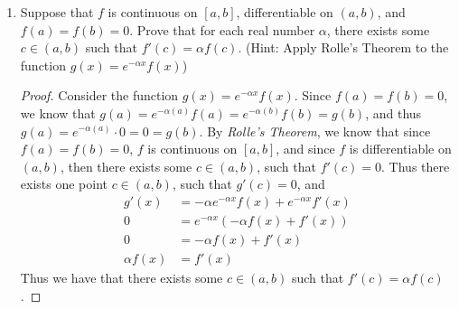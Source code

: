 \documentclass[12pt,letterpaper]{article}
\newcommand{\st}{\ \text{s.t.}\ }
\theoremstyle{case}
\theoremstyle{definition}
\newtheorem{theorem*}{Theorem}
\begin{document}
\begin{enumerate}
\begin{enumerate}
\begin{proof}
				Let $h(x)=f(x)^{g(x)}$.\\
				
				Then we have $h(x_1)=h(x_2)=0$ and $h$ is differentiable on $(a,b)$, and $h$ is continuous on $[x_1,x_2]$.\\
				
				Recall \textit{Rolle's Theorem}:
				\begin{theorem*}[\textbf{Rolle's Theorem}]
					Suppose that $f$ is continuous on a closed interval $I:= [a,b]$, that the derivative $f'$ exists at every point of the open interval $(a,b)$, and that $f(a)=f(b)=0$. Then there exists at least one point $c$ in $(a,b)$ such that $f'(c)=0$.
				\end{theorem*}
				Thus by \textit{Rolle's Theorem}, we know that there exists some $c \in (x_1,x_2) \st h'(c)=0$ and
				\[h'(x)=f'(x)e^{g(x)}+f(x)\cdot g'(x)e^{g(x)}=[f'(x)+f(x)g'(x)]e^{g(x)}\]
				So $h'(c)=[f'(c)+f(c)g'(c)]\cdot e^{g(c)}=0$ \\
				
				So $f'(c)+f(c)g'(c)=0$.
			\end{proof}
			
			\item Suppose that $f$ is continuous on $[a,b]$, differentiable on $(a,b)$, and $f(a)=f(b)=0$. Prove that for each real number $\alpha$, there exists some $c \in (a,b)$ such that $f'(c)=\alpha f(c)$. (Hint: Apply Rolle's Theorem to the function $g(x)=e^{-\alpha x} f(x)$)
			
			\begin{proof}
				Consider the function $g(x)=e^{-\alpha x} f(x)$. Since $f(a)=f(b)=0$, we know that $g(a)=e^{-\alpha(a)}f(a)=e^{-\alpha(b)}f(b)=g(b)$, and thus $g(a)= e^{-\alpha(a)}\cdot 0 = 0 = g(b)$. By \textit{Rolle's Theorem}, we know that since $f(a)=f(b)=0$, $f$ is continuous on $[a,b]$, and since $f$ is differentiable on $(a,b)$, then there exists some $c \in (a,b)$, such that $f'(c)=0$. Thus there exists one point $c \in (a,b)$, such that $g'(c)=0$, and
				\begin{align*}
					g'(x)&=-\alpha e^{-\alpha x}f(x)+e^{-\alpha x}f'(x) \\
					0 &= e^{-\alpha x} \left(-\alpha f(x)+f'(x)\right) \\
					0 &= -\alpha f(x)+f'(x) \\
					\alpha f(x) &= f'(x)
				\end{align*}
				Thus we have that there exists some $c \in (a,b)$ such that $f'(c) = \alpha f(c)$.
			\end{proof}
			

\end{enumerate}
\end{enumerate}
\end{document}
